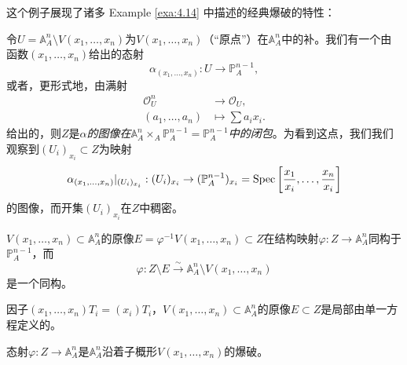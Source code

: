 这个例子展现了诸多 Example \ref{exa:4.14} 中描述的经典爆破的特性：
\begin{compactenum}[(1)]
	\item 令$U=\mathbb A_A^n\setminus V(x_1,\dots,x_n)$为$V(x_1,\dots,x_n)$（“原点”）在$\mathbb A_A^n$中的补。我们有一个由函数$(x_1,\dots,x_n)$给出的态射
	\[
		\alpha_{(x_1,\dots,x_n)}:U\to \mathbb P_A^{n-1},
	\]
	或者，更形式地，由满射
	\[
		\begin{aligned}
			\mathscr O_U^n & \longrightarrow \mathscr O_U,\\
			(a_1,\dots,a_n)&\longmapsto \sum a_ix_i.
		\end{aligned}
	\]
	给出的，则$Z$是\textit{$\alpha$的图像在$\mathbb A_A^n\times_A \mathbb P_A^{n-1}=\mathbb P_A^{n-1}$中的闭包}。为看到这点，我们我们观察到$(U_i)_{x_i}\subset Z$为映射
	\[
		\alpha_{(x_1,\dots,x_n)}|_{(U_i)_{x_i}}:(U_i)_{x_i}\to (\mathbb P_A^{n-1})_{x_i}=\operatorname{Spec} \left[\frac{x_1}{x_i},\dots,\frac{x_n}{x_i}\right]
	\]
	的图像，而开集$(U_i)_{x_i}$在$Z$中稠密。
	\item $V(x_1,\dots,x_n)\subset \mathbb A_A^n$的原像$E=\varphi^{-1}V(x_1,\dots,x_n)\subset Z$在结构映射$\varphi:Z\to \mathbb A_A^n$同构于$\mathbb P_A^{n-1}$，而
	\[
		\varphi:Z\setminus E\xrightarrow{\sim}\mathbb A_A^n\setminus V(x_1,\dots,x_n)
	\]
	是一个同构。
	\item 因子$(x_1,\dots,x_n)T_i=(x_i)T_i$，$V(x_1,\dots,x_n)\subset \mathbb A_A^n$的原像$E\subset Z$是局部由单一方程定义的。
\end{compactenum}

\begin{pro}\label{pro:4.18}
	态射$\varphi:Z\to \mathbb A_A^n$是$\mathbb A_A^n$沿着子概形$V(x_1,\dots,x_n)$的爆破。
\end{pro}

